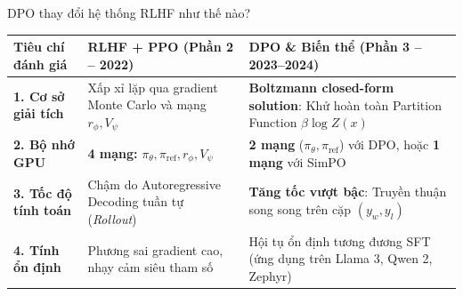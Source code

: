\begin{frame}{DPO thay đổi hệ thống RLHF như thế nào?}
  \vspace{0.05cm}
  \small
  \renewcommand{\arraystretch}{1.20}
  \begin{tabularx}{\textwidth}{@{}p{3.4cm} X X@{}}
    \toprule
    \textbf{Tiêu chí đánh giá} & \textbf{RLHF + PPO (Phần 2 -- 2022)} & \textbf{DPO \& Biến thể (Phần 3 -- 2023--2024)} \\
    \midrule
    \textbf{1. Cơ sở giải tích} & Xấp xỉ lặp qua gradient Monte Carlo và mạng $r_\phi, V_\psi$ & \textbf{\textcolor{tealgreen}{Boltzmann closed-form solution}}: Khử hoàn toàn Partition Function $\beta \log Z(x)$ \\

    \textbf{2. Bộ nhớ GPU} & \textbf{4 mạng:} $\pi_\theta, \pi_{\text{ref}}, r_\phi, V_\psi$ & \textbf{\textcolor{tealgreen}{2 mạng}} ($\pi_\theta, \pi_{\text{ref}}$) với DPO, hoặc \textbf{1 mạng} với SimPO \\

    \textbf{3. Tốc độ tính toán} & Chậm do Autoregressive Decoding tuần tự (\textit{Rollout}) & \textbf{\textcolor{tealgreen}{Tăng tốc vượt bậc}}: Truyền thuận song song trên cặp $(y_w, y_l)$ \\

    \textbf{4. Tính ổn định} & Phương sai gradient cao, nhạy cảm siêu tham số & Hội tụ ổn định tương đương SFT (ứng dụng trên Llama 3, Qwen 2, Zephyr) \\
    \bottomrule
  \end{tabularx}
  \par\vspace{0pt}
\end{frame}

